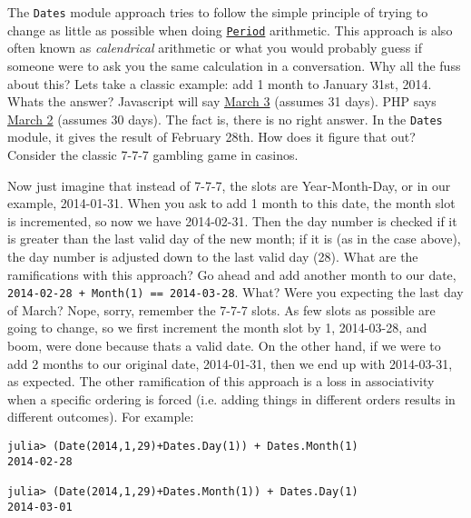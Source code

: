 The \texttt{Dates} module approach tries to follow the simple principle of trying to change as little as possible when doing \hyperlink{17624028548543163266}{\texttt{Period}} arithmetic. This approach is also often known as \emph{calendrical} arithmetic or what you would probably guess if someone were to ask you the same calculation in a conversation. Why all the fuss about this? Let{\textquotesingle}s take a classic example: add 1 month to January 31st, 2014. What{\textquotesingle}s the answer? Javascript will say \href{https://markhneedham.com/blog/2009/01/07/javascript-add-a-month-to-a-date/}{March 3} (assumes 31 days). PHP says \href{https://stackoverflow.com/questions/5760262/php-adding-months-to-a-date-while-not-exceeding-the-last-day-of-the-month}{March 2} (assumes 30 days). The fact is, there is no right answer. In the \texttt{Dates} module, it gives the result of February 28th. How does it figure that out? Consider the classic 7-7-7 gambling game in casinos.



Now just imagine that instead of 7-7-7, the slots are Year-Month-Day, or in our example, 2014-01-31. When you ask to add 1 month to this date, the month slot is incremented, so now we have 2014-02-31. Then the day number is checked if it is greater than the last valid day of the new month; if it is (as in the case above), the day number is adjusted down to the last valid day (28). What are the ramifications with this approach? Go ahead and add another month to our date, \texttt{2014-02-28 + Month(1) == 2014-03-28}. What? Were you expecting the last day of March? Nope, sorry, remember the 7-7-7 slots. As few slots as possible are going to change, so we first increment the month slot by 1, 2014-03-28, and boom, we{\textquotesingle}re done because that{\textquotesingle}s a valid date. On the other hand, if we were to add 2 months to our original date, 2014-01-31, then we end up with 2014-03-31, as expected. The other ramification of this approach is a loss in associativity when a specific ordering is forced (i.e. adding things in different orders results in different outcomes). For example:




\begin{verbatim}
julia> (Date(2014,1,29)+Dates.Day(1)) + Dates.Month(1)
2014-02-28

julia> (Date(2014,1,29)+Dates.Month(1)) + Dates.Day(1)
2014-03-01
\end{verbatim}



